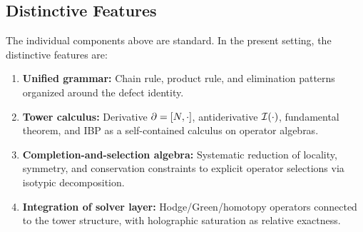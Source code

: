 \subsection{Distinctive Features}
\label{subsec:what-is-new}

The individual components above are standard. In the present setting, the
distinctive features are:
\begin{enumerate}[label=(\roman*), itemsep=0.3em]
\item \textbf{Unified grammar:} Chain rule, product rule, and elimination patterns organized around the defect identity.
\item \textbf{Tower calculus:} Derivative $\partial = [N, \cdot]$, antiderivative $\mathcal{I}(\cdot)$, fundamental theorem, and IBP as a self-contained calculus on operator algebras.
\item \textbf{Completion-and-selection algebra:} Systematic reduction of locality, symmetry, and conservation constraints to explicit operator selections via isotypic decomposition.
\item \textbf{Integration of solver layer:} Hodge/Green/homotopy operators connected to the tower structure, with holographic saturation as relative exactness.
\end{enumerate}
